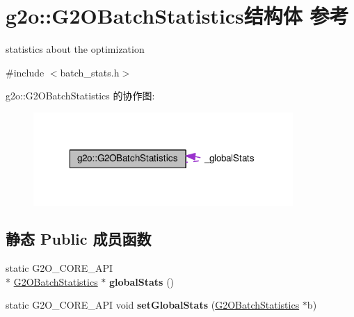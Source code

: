 \hypertarget{structg2o_1_1G2OBatchStatistics}{\section{g2o\-:\-:G2\-O\-Batch\-Statistics结构体 参考}
\label{structg2o_1_1G2OBatchStatistics}
}


statistics about the optimization  




{\ttfamily \#include $<$batch\-\_\-stats.\-h$>$}



g2o\-:\-:G2\-O\-Batch\-Statistics 的协作图\-:
\nopagebreak
\begin{figure}[H]
\begin{center}
\leavevmode
\includegraphics[width=280pt]{structg2o_1_1G2OBatchStatistics__coll__graph}
\end{center}
\end{figure}
\subsection*{静态 Public 成员函数}
\begin{DoxyCompactItemize}
\item 
\hypertarget{structg2o_1_1G2OBatchStatistics_a85d57b829bde666635a26d52e17f20b5}{static G2\-O\-\_\-\-C\-O\-R\-E\-\_\-\-A\-P\-I \\*
\hyperlink{structg2o_1_1G2OBatchStatistics}{G2\-O\-Batch\-Statistics} $\ast$ {\bfseries global\-Stats} ()}\label{structg2o_1_1G2OBatchStatistics_a85d57b829bde666635a26d52e17f20b5}

\item 
\hypertarget{structg2o_1_1G2OBatchStatistics_a8c56e85d25e346ba87718621407247fc}{static G2\-O\-\_\-\-C\-O\-R\-E\-\_\-\-A\-P\-I void {\bfseries set\-Global\-Stats} (\hyperlink{structg2o_1_1G2OBatchStatistics}{G2\-O\-Batch\-Statistics} $\ast$b)}\label{structg2o_1_1G2OBatchStatistics_a8c56e85d25e346ba87718621407247fc}

\end{DoxyCompactItemize}
